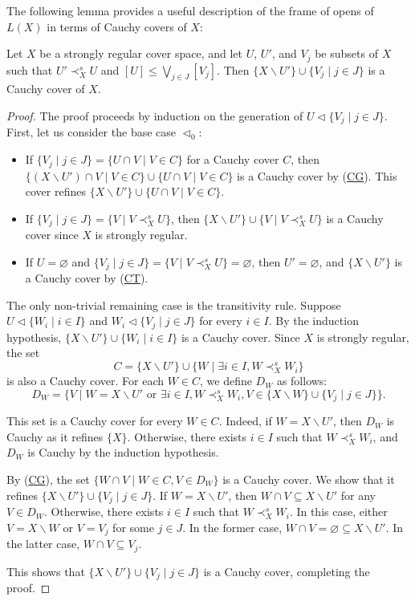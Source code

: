 \documentclass[reqno]{amsart}
\newcommand{\axref}[1]{(\hyperref[ax:#1]{#1})}
\theoremstyle{definition}
\theoremstyle{remark}
\numberwithin{figure}{section}
\newcommand{\rb}{\prec}
\begin{document}
The following lemma provides a useful description of the frame of opens of $L(X)$ in terms of Cauchy covers of $X$:

\begin{lem}
Let $X$ be a strongly regular cover space, and let $U$, $U'$, and $V_j$ be subsets of $X$ such that $U' \rb^s_X U$ and $[U] \leq \bigvee_{j \in J} [V_j]$.
Then $\{ X \backslash U' \} \cup \{ V_j \mid j \in J \}$ is a Cauchy cover of $X$.
\end{lem}
\begin{proof}
The proof proceeds by induction on the generation of $U \triangleleft \{ V_j \mid j \in J \}$.
First, let us consider the base case $\triangleleft_0$:
\begin{itemize}
\item If $\{ V_j \mid j \in J \} = \{ U \cap V \mid V \in C \}$ for a Cauchy cover $C$, then $\{ (X \backslash U') \cap V \mid V \in C \} \cup \{ U \cap V \mid V \in C \}$ is a Cauchy cover by \axref{CG}.
        This cover refines $\{ X \backslash U' \} \cup \{ U \cap V \mid V \in C \}$.
\item If $\{ V_j \mid j \in J \} = \{ V \mid V \rb^s_X U \}$, then $\{ X \backslash U' \} \cup \{ V \mid V \rb^s_X U \}$ is a Cauchy cover since $X$ is strongly regular.
\item If $U = \varnothing$ and $\{ V_j \mid j \in J \} = \{ V \mid V \rb^s_X U \} = \varnothing$, then $U' = \varnothing$, and $\{ X \backslash U' \}$ is a Cauchy cover by \axref{CT}.
\end{itemize}

The only non-trivial remaining case is the transitivity rule.
Suppose $U \triangleleft \{ W_i \mid i \in I \}$ and $W_i \triangleleft \{ V_j \mid j \in J \}$ for every $i \in I$.
By the induction hypothesis, $\{ X \backslash U'\} \cup \{ W_i \mid i \in I \}$ is a Cauchy cover.
Since $X$ is strongly regular, the set
\[ C = \{ X \backslash U'\} \cup \{ W \mid \exists i \in I, W \rb^s_X W_i \} \]
is also a Cauchy cover.
For each $W \in C$, we define $D_W$ as follows:
\[ D_W = \{ V \mid W = X \backslash U' \textrm{ or } \exists i \in I, W \rb^s_X W_i, V \in \{ X \backslash W \} \cup \{ V_j \mid j \in J \} \}. \]

This set is a Cauchy cover for every $W \in C$.
Indeed, if $W = X \backslash U'$, then $D_W$ is Cauchy as it refines $\{ X \}$.
Otherwise, there exists $i \in I$ such that $W \rb^s_X W_i$, and $D_W$ is Cauchy by the induction hypothesis.

By \axref{CG}, the set $\{ W \cap V \mid W \in C, V \in D_W \}$ is a Cauchy cover.
We show that it refines $\{ X \backslash U'\} \cup \{ V_j \mid j \in J \}$.
If $W = X \backslash U'$, then $W \cap V \subseteq X \backslash U'$ for any $V \in D_W$.
Otherwise, there exists $i \in I$ such that $W \rb^s_X W_i$.
In this case, either $V = X \backslash W$ or $V = V_j$ for some $j \in J$.
In the former case, $W \cap V = \varnothing \subseteq X \backslash U'$.
In the latter case, $W \cap V \subseteq V_j$.

This shows that $\{ X \backslash U'\} \cup \{ V_j \mid j \in J \}$ is a Cauchy cover, completing the proof.
\end{proof}
\end{document}
